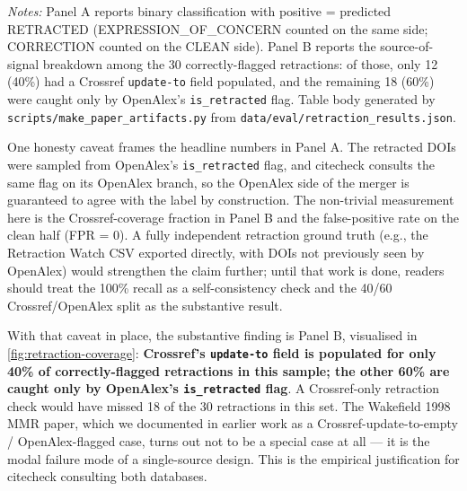 \documentclass[12pt]{article}
\begin{document}
\begin{table}[htbp]
\centering
\caption{Phase 2 retraction check: binary scoring and source coverage}
\label{tab:eval-retraction}
\begin{threeparttable}

\begin{tablenotes}\small
\item \textit{Notes:} Panel A reports binary classification with positive = predicted RETRACTED (EXPRESSION\_OF\_CONCERN counted on the same side; CORRECTION counted on the CLEAN side). Panel B reports the source-of-signal breakdown among the 30 correctly-flagged retractions: of those, only 12 (40\%) had a Crossref \texttt{update-to} field populated, and the remaining 18 (60\%) were caught only by OpenAlex's \texttt{is\_retracted} flag. Table body generated by \texttt{scripts/make\_paper\_artifacts.py} from \texttt{data/eval/retraction\_results.json}.
\end{tablenotes}
\end{threeparttable}
\end{table}

One honesty caveat frames the headline numbers in Panel A. The retracted DOIs were sampled from OpenAlex's \texttt{is\_retracted} flag, and citecheck consults the same flag on its OpenAlex branch, so the OpenAlex side of the merger is guaranteed to agree with the label by construction. The non-trivial measurement here is the Crossref-coverage fraction in Panel B and the false-positive rate on the clean half (FPR = 0). A fully independent retraction ground truth (e.g., the Retraction Watch CSV exported directly, with DOIs not previously seen by OpenAlex) would strengthen the claim further; until that work is done, readers should treat the 100\% recall as a self-consistency check and the 40/60 Crossref/OpenAlex split as the substantive result.

With that caveat in place, the substantive finding is Panel B, visualised in \cref{fig:retraction-coverage}: \textbf{Crossref's \texttt{update-to} field is populated for only 40\% of correctly-flagged retractions in this sample; the other 60\% are caught only by OpenAlex's \texttt{is\_retracted} flag}. A Crossref-only retraction check would have missed 18 of the 30 retractions in this set. The Wakefield 1998 MMR paper, which we documented in earlier work as a Crossref-update-to-empty / OpenAlex-flagged case, turns out not to be a special case at all --- it is the modal failure mode of a single-source design. This is the empirical justification for citecheck consulting both databases.
\end{document}
